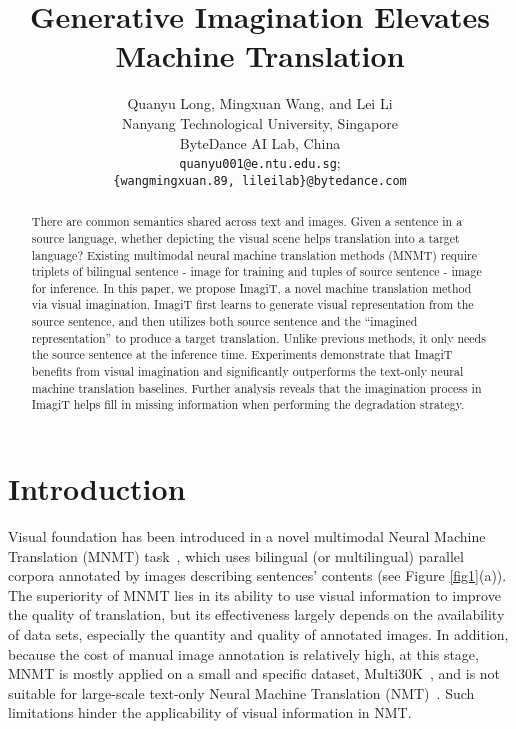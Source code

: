 \documentclass[11pt]{article}
\title{Generative Imagination Elevates Machine Translation}
\author{Quanyu Long, Mingxuan Wang, and Lei Li \\
  Nanyang Technological University, Singapore \\
  ByteDance AI Lab, China\\
  \texttt{quanyu001@e.ntu.edu.sg}; \\
  \texttt{\{wangmingxuan.89, lileilab\}@bytedance.com}
  }
\newcommand{\method}{ImagiT\xspace}
\begin{document}
\maketitle

\begin{abstract}
There are common semantics shared across text and images. 
Given a sentence in a source language, whether depicting the visual scene helps translation into a target language?
Existing multimodal neural machine translation methods (MNMT) require triplets of bilingual sentence - image for training and tuples of source sentence - image for inference.
In this paper, we propose \method, a novel machine translation method via visual imagination. 
\method first learns to generate visual representation from the source sentence, and then utilizes both source sentence and the ``imagined representation'' to produce a target translation.
Unlike previous methods, it only needs the source sentence at the inference time. 
Experiments demonstrate that \method benefits from visual imagination and significantly outperforms the text-only neural machine translation baselines. 
Further analysis reveals that the imagination process in \method  helps fill in missing information when performing the degradation strategy. 



%
 \end{abstract}

\section{Introduction}
\label{sec:intro}
Visual foundation has been introduced in a novel multimodal Neural Machine Translation (MNMT) task~\citep{specia2016shared,elliott2017findings,barrault2018findings}, which uses bilingual (or multilingual) parallel corpora annotated by images describing sentences' contents (see Figure \ref{fig1}(a)). The superiority of MNMT lies in its ability to use visual information to improve the quality of translation, but its effectiveness largely depends on the availability of data sets, especially the quantity and quality of annotated images. In addition, because the cost of manual image annotation is relatively high, at this stage, MNMT is mostly applied on a small and specific dataset, Multi30K~\cite{elliott2016multi30k}, and is not suitable for large-scale text-only Neural Machine Translation (NMT)~\cite{bahdanau2014neural,vaswani2017attention}. Such limitations hinder the applicability of visual information in NMT.
\end{document}
